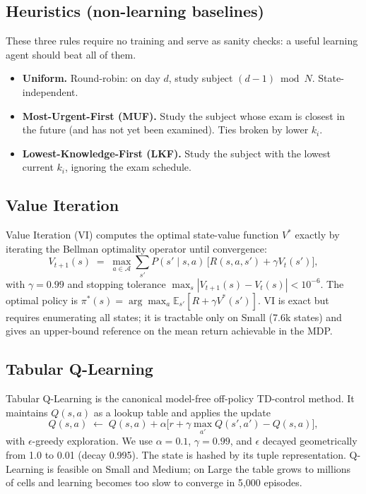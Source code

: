 \documentclass[a4paper,11pt]{article}
\theoremstyle{definition}
\begin{document}
\subsection{Heuristics (non-learning baselines)}

These three rules require no training and serve as sanity checks: a useful learning agent should beat all of them.
\begin{itemize}
    \item \textbf{Uniform.} Round-robin: on day $d$, study subject $(d - 1) \bmod N$. State-independent.
    \item \textbf{Most-Urgent-First (MUF).} Study the subject whose exam is closest in the future (and has not yet been examined). Ties broken by lower $k_i$.
    \item \textbf{Lowest-Knowledge-First (LKF).} Study the subject with the lowest current $k_i$, ignoring the exam schedule.
\end{itemize}

\subsection{Value Iteration}

Value Iteration (VI) \citep{bellman1957,sutton2018} computes the optimal state-value function $V^*$ exactly by iterating the Bellman optimality operator until convergence:
\begin{equation}
    V_{t+1}(s) \;=\; \max_{a \in \mathcal{A}} \sum_{s'} P(s' \mid s, a)\,\bigl[R(s, a, s') + \gamma V_t(s')\bigr],
    \label{eq:bellman}
\end{equation}
with $\gamma = 0.99$ and stopping tolerance $\max_s |V_{t+1}(s) - V_t(s)| < 10^{-6}$. The optimal policy is $\pi^*(s) = \arg\max_a \mathbb{E}_{s'}[R + \gamma V^*(s')]$. VI is exact but requires enumerating all states; it is tractable only on Small (7.6k states) and gives an upper-bound reference on the mean return achievable in the MDP.

\subsection{Tabular Q-Learning}

Tabular Q-Learning \citep{watkins1992,sutton2018} is the canonical model-free off-policy TD-control method. It maintains $Q(s, a)$ as a lookup table and applies the update
\begin{equation}
    Q(s, a) \;\leftarrow\; Q(s, a) + \alpha \big[r + \gamma \max_{a'} Q(s', a') - Q(s, a)\big],
    \label{eq:qlearning}
\end{equation}
with $\epsilon$-greedy exploration. We use $\alpha = 0.1$, $\gamma = 0.99$, and $\epsilon$ decayed geometrically from 1.0 to 0.01 (decay 0.995). The state is hashed by its tuple representation. Q-Learning is feasible on Small and Medium; on Large the table grows to millions of cells and learning becomes too slow to converge in 5{,}000 episodes.
\end{document}

